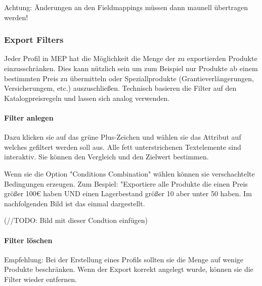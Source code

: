 \documentclass[a4paper]{article}
\begin{document}
Achtung: Änderungen an den Fieldmappings müssen dann maunell 
übertragen werden!

\subsubsection{Export Filters}
Jeder Profil in MEP hat die Möglichkeit die Menge der zu exportierden 
Produkte einzusschränken. Dies kann nützlich sein um zum Beispiel nur 
Produkte ab einem bestimmten Preis zu übermitteln oder 
Speziallprodukte (Grantieverlängerungen, Versicherungem, etc.) 
auszuschließen. Technisch basieren die Filter auf den 
Katalogpreisregeln und lassen sich analog verwenden.

\paragraph{Filter anlegen}
Dazu klicken sie auf das grüne Plus-Zeichen und wählen sie das 
Attribut auf welches gefiltert werden soll aus. Alle fett 
unterstrichenen Textelemente sind interaktiv. Sie können den Vergleich 
und den Zielwert bestimmen.

Wenn sie die Option "Conditions Combination" wählen können sie 
verschachtelte Bedingungen erzeugen. Zum Bespiel: "Exportiere alle 
Produkte die einen Preis größer 100€ haben UND einen Lagerbestand 
größer 10 aber unter 50 haben. Im nachfolgenden Bild ist das einmal 
dargestellt.

(//TODO: Bild mit dieser Condtion einfügen)

\paragraph{Filter löschen}

Empfehlung: Bei der Erstellung eines Profils sollten sie die Menge auf 
wenige Produkte beschränken. Wenn der Export korrekt angelegt wurde, 
können sie die Filter wieder entfernen.
\end{document}

